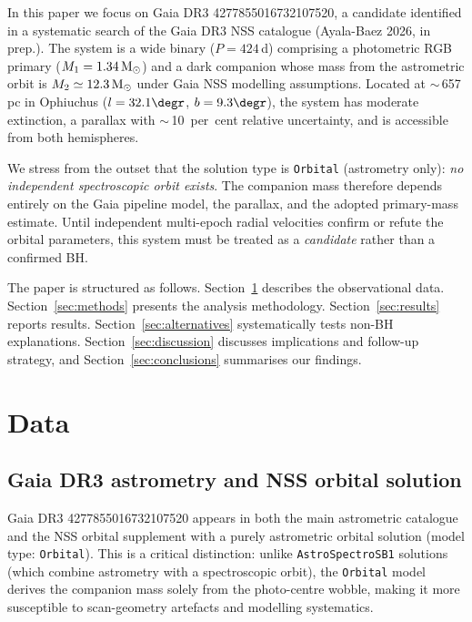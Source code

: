 \documentclass[usenatbib,fleqn]{mnras}
\newcommand{\Msun}{{\rm M}_\odot}
\begin{document}
In this paper we focus on Gaia DR3 4277855016732107520, a candidate
identified in a systematic search of the Gaia DR3 NSS catalogue
(Ayala-Baez 2026, in prep.).  The system is a wide binary
($P = 424$\,d) comprising a photometric RGB primary
($M_1 = 1.34\,\Msun$) and a dark companion whose mass from
the astrometric orbit is $M_2 \simeq 12.3\,\Msun$ under Gaia
NSS modelling assumptions.  Located at
$\sim$\,657\,pc in Ophiuchus ($l = 32.1\degr$, $b = 9.3\degr$),
the system has moderate extinction, a parallax with
$\sim$\,10~per~cent relative uncertainty, and is accessible from
both hemispheres.

We stress from the outset that the solution type is
\texttt{Orbital} (astrometry only): \emph{no independent
spectroscopic orbit exists}.  The companion mass therefore depends
entirely on the Gaia pipeline model, the parallax, and the adopted
primary-mass estimate.  Until independent multi-epoch radial
velocities confirm or refute the orbital parameters, this system
must be treated as a \emph{candidate} rather than a confirmed BH.

The paper is structured as follows.  Section~\ref{sec:data}
describes the observational data.  Section~\ref{sec:methods}
presents the analysis methodology.  Section~\ref{sec:results}
reports results.  Section~\ref{sec:alternatives} systematically
tests non-BH explanations.  Section~\ref{sec:discussion} discusses
implications and follow-up strategy, and
Section~\ref{sec:conclusions} summarises our findings.

\section{Data}
\label{sec:data}

\subsection{Gaia DR3 astrometry and NSS orbital solution}
\label{sec:data:gaia}

Gaia DR3 4277855016732107520 appears in both the main astrometric
catalogue and the NSS orbital supplement with a purely astrometric
orbital solution (model type: \texttt{Orbital}).  This is a critical
distinction: unlike \texttt{AstroSpectroSB1} solutions (which
combine astrometry with a spectroscopic orbit), the \texttt{Orbital}
model derives the companion mass solely from the photo-centre
wobble, making it more susceptible to scan-geometry artefacts and
modelling systematics.
\end{document}
